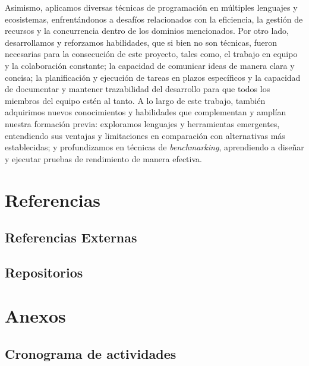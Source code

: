 \documentclass[11pt]{article}
\let\Oldsection\section
\renewcommand{\section}{\FloatBarrier\Oldsection}
\let\Oldsubsection\subsection
\renewcommand{\subsection}{\FloatBarrier\Oldsubsection}
\newcommand{\english}[1]{\textit{#1}}
\begin{document}
Asimismo, aplicamos diversas técnicas de programación en múltiples lenguajes y ecosistemas, enfrentándonos a desafíos relacionados con la eficiencia, la gestión de recursos y la concurrencia dentro de los dominios mencionados. Por otro lado, desarrollamos y reforzamos habilidades, que si bien no son técnicas, fueron necesarias para la consecución de este proyecto, tales como, el trabajo en equipo y la colaboración constante; la capacidad de comunicar ideas de manera clara y concisa; la planificación y ejecución de tareas en plazos específicos y la capacidad de documentar y mantener trazabilidad del desarrollo para que todos los miembros del equipo estén al tanto. A lo largo de este trabajo, también adquirimos nuevos conocimientos y habilidades que complementan y amplían nuestra formación previa: exploramos lenguajes y herramientas emergentes, entendiendo sus ventajas y limitaciones en comparación con alternativas más establecidas; y profundizamos en técnicas de \english{benchmarking}, aprendiendo a diseñar y ejecutar pruebas de rendimiento de manera efectiva.

\newpage

\section{Referencias}

\subsection{Referencias Externas}

\begingroup
\raggedright
\printbibliography[notkeyword={repos},heading=none] %
\endgroup

\subsection{Repositorios}

\begingroup
\raggedright
\printbibliography[keyword={repos},nottype=unused,heading=none]
\nocite{*} %
\endgroup

\newpage

\section{Anexos}

\subsection{Cronograma de actividades} \label{sec:annex:schedule}
\end{document}
